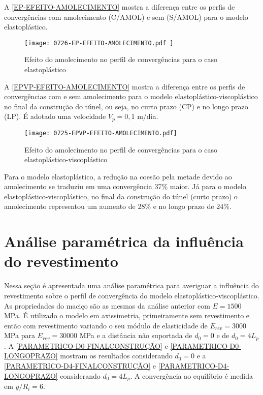 A \autoref{EP-EFEITO-AMOLECIMENTO} mostra a diferença entre os perfis de convergências com amolecimento (C/AMOL) e sem (S/AMOL) para o modelo elastoplástico.

\begin{figure}[H]
	\begin{center}
		\texttt{[image: 0726-EP-EFEITO-AMOLECIMENTO.pdf
		]}
	\end{center}
	\caption{\label{EP-EFEITO-AMOLECIMENTO}Efeito do amolecimento no perfil de convergências para o caso elastoplástico}
\end{figure}

A \autoref{EPVP-EFEITO-AMOLECIMENTO} mostra a diferença entre os perfis de convergências com e sem amolecimento para o modelo elastoplástico-viscoplástico no final da construção do túnel, ou seja, no curto prazo (CP) e no longo prazo (LP). É adotado uma velocidade $V_p=0,1$ m/dia.

\begin{figure}[H]
	\begin{center}
		\texttt{[image: 0725-EPVP-EFEITO-AMOLECIMENTO.pdf]}
	\end{center}
	\caption{\label{EPVP-EFEITO-AMOLECIMENTO}Efeito do amolecimento no perfil de convergências para o caso elastoplástico-viscoplástico}
\end{figure}

Para o modelo elastoplástico, a redução na coesão pela metade devido ao amolecimento se traduziu em uma convergência 37\% maior. Já para o modelo elastoplástico-viscoplástico, no final da construção do túnel (curto prazo) o amolecimento representou um aumento de 28\% e no longo prazo de 24\%.


\section{Análise paramétrica da influência do revestimento}

Nessa seção é apresentada uma análise paramétrica para averiguar a influência do revestimento sobre o perfil de convergência do modelo elastoplástico-viscoplástico. As propriedades do maciço são as mesmas da análise anterior com $E= 1500$ MPa. É utilizado o modelo em axissimetria, primeiramente sem revestimento e então com revestimento variando o seu módulo de elasticidade de $E_{rev} = 3000$ MPa para $E_{rev} = 30000$ MPa e a distância não suportada de $d_0 = 0$ e de $d_0 = 4L_p$. A \autoref{PARAMETRICO-D0-FINALCONSTRUÇÃO} e \autoref{PARAMETRICO-D0-LONGOPRAZO} mostram os resultados considerando $d_0 = 0$ e a \autoref{PARAMETRICO-D4-FINALCONSTRUÇÃO} e \autoref{PARAMETRICO-D4-LONGOPRAZO} considerando $d_0=4L_p$. A convergência ao equilíbrio é medida em $y/R_i = 6$. 

